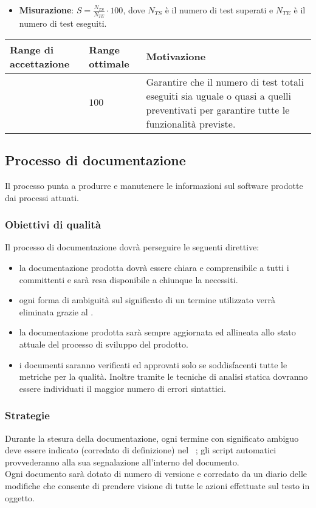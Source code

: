 \begin{itemize}
\item \textbf{Misurazione}: $S=\frac{N_{TS}}{N_{TE}} \cdot 100$, dove $N_{TS}$ è il numero di test superati e $N_{TE}$ è il numero di test eseguiti.
\end{itemize}

\begin{center}
		\begin{tabular}{|P{2.5cm}|P{2.5cm}|P{6cm}|}
		\hline
			\textbf{Range di accettazione}	& \textbf{Range ottimale} & \textbf{Motivazione} \\
			\hline
			[$90 - 100$] & $100$ &	Garantire che il numero di test totali eseguiti sia uguale o quasi a quelli preventivati per garantire tutte le funzionalità previste. \\
			\hline
			\end{tabular}
\end{center}



\subsection{Processo di documentazione}

Il processo punta a produrre e manutenere le informazioni sul software prodotte dai processi attuati.
\subsubsection{Obiettivi di qualità}
Il processo di documentazione dovrà perseguire le seguenti direttive:
\begin{itemize}
\item la documentazione prodotta dovrà essere chiara e comprensibile a tutti i committenti e sarà resa disponibile a chiunque la necessiti.
\item ogni forma di ambiguità sul significato di un termine utilizzato verrà eliminata grazie al \glossario.
\item la documentazione prodotta sarà sempre aggiornata ed allineata allo stato attuale del processo di sviluppo del prodotto.
\item i documenti saranno verificati ed approvati solo se soddisfacenti tutte le metriche per la qualità. Inoltre tramite le tecniche di analisi statica dovranno essere individuati il maggior numero di errori sintattici.
\end{itemize}
\subsubsection{Strategie}
Durante la stesura della documentazione, ogni termine con significato ambiguo deve essere indicato (corredato di definizione) nel \glossario\ ; gli script automatici provvederanno alla sua segnalazione all'interno del documento.\\
Ogni documento sarà dotato di numero di versione e corredato da un diario delle modifiche che consente di prendere visione di tutte le azioni effettuate sul testo in oggetto.

